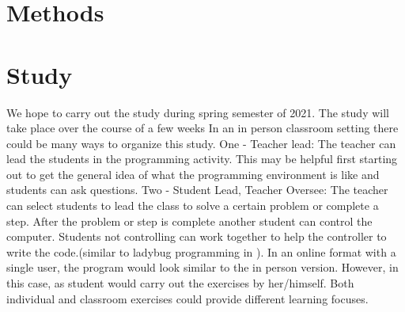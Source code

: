 \section{Methods}


    
\section*{Study}
We hope to carry out the study during spring semester of 2021.
The study will take place over the course of a few weeks
In an in person classroom setting there could be many ways to organize this study. 
One - Teacher lead:
The teacher can lead the students in the programming activity. This may be helpful first starting out to get the general idea of what the programming environment is like and students can ask questions.
Two - Student Lead, Teacher Oversee: 
The teacher can select students to lead the class to solve a certain problem or complete a step. After the problem or step is complete another student can control the computer. Students not controlling can work together to help the controller to write the code.(similar to ladybug programming in \cite{fessakis}).
In an online format with a single user, the program would look similar to the in person version. However, in this case, as student would carry out the exercises by her/himself. 
Both individual and classroom exercises could provide different learning focuses. 


